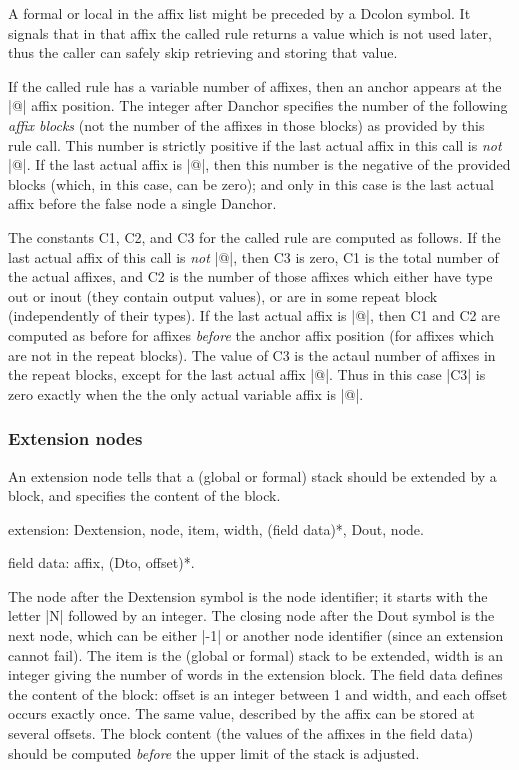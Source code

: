 \documentclass[titlepage]{article}
\newenvironment{grammar}{%
\begin{list}{}{%
\setlength\leftmargin{18pt}%
\setlength\rightmargin{-5pt}%
\setlength\listparindent{20pt}%
\setlength\itemsep{1pt plus0.2ex}%
\setlength\parsep{0pt plus 2pt}%
\setlength\labelsep{-5pt}%
}\color{blue!90!black}\sf\mkoptions%
}{\end{list}}
\newcommand\g[1]{\textsf{\color{blue!90!black}#1}}
\begin{document}
A \g{formal} or \g{local} in the affix list might be preceded by a
\g{Dcolon} symbol. It signals that in that affix the called rule returns a
value which is not used later, thus the caller can safely skip retrieving
and storing that value.

\smallskip

If the called rule has a variable number of affixes, then an \g{anchor}
appears at the \pp|@| affix position. The \g{integer} after \g{Danchor}
specifies the number of the following \emph{affix blocks} (not the number of
the affixes in those blocks) as provided by this rule call. This number is
strictly positive if the last actual affix in this call is \emph{not}
\pp|@|. If the last actual affix is \pp|@|, then this number is the negative
of the provided blocks (which, in this case, can be zero); and only in this
case is the last actual affix before the \g{false node} a single
\g{Danchor}.

\smallskip

The constants \g{C1}, \g{C2}, and \g{C3} for the called rule are computed as
follows. If the last actual affix of this call is \emph{not} \pp|@|, then
\g{C3} is zero, \g{C1} is the total number of the actual affixes, and \g{C2}
is the number of those affixes which either have type out or inout (they
contain output values), or are in some repeat block (independently of their
types). If the last actual affix is \pp|@|, then \g{C1} and \g{C2} are
computed as before for affixes \emph{before} the anchor affix position (for
affixes which are not in the repeat blocks). The value of \g{C3} is the
actaul number of affixes in the repeat blocks, except for the last actual
affix \pp|@|. Thus in this case \pp|C3| is zero exactly when the the only
actual variable affix is \pp|@|.

\subsubsection{Extension nodes}

An extension node tells that a (global or formal) stack should be
extended by a block, and specifies the content of the block.
\begin{grammar}
\item extension: Dextension, node, item, width, (field data)*, Dout, node.
\item field data: affix, (Dto, offset)*.
\end{grammar}
The \g{node} after the \g{Dextension} symbol is the node identifier; it
starts with the letter \pp|N| followed by an integer. The closing \g{node}
after the \g{Dout} symbol is the next node, which can be either \pp|-1| or
another node identifier (since an extension cannot fail). The \g{item} is 
the (global or formal) stack to be
extended, \g{width} is an integer giving the number of words in the
extension block. The \g{field data} defines the content of the block: \g{offset}
is an integer between 1 and \g{width}, and each offset occurs exactly once. The
same value, described by the \g{affix} can be stored at several offsets. The
block content (the values of the \g{affix}es in the \g{field data}) should
be computed \emph{before} the upper limit of the stack is adjusted.
\end{document}
